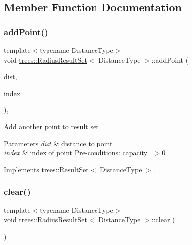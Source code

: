 \subsection{Member Function Documentation}
\mbox{\label{classtrees_1_1_radius_result_set_a65652623444c8beb35a1d27a86117b2a}} 
\subsubsection{\texorpdfstring{add\+Point()}{addPoint()}}
{\footnotesize\ttfamily template$<$typename Distance\+Type$>$ \\
void \hyperlink{classtrees_1_1_radius_result_set}{trees\+::\+Radius\+Result\+Set}$<$ Distance\+Type $>$\+::add\+Point (\begin{DoxyParamCaption}\item[{Distance\+Type}]{dist,  }\item[{size\+\_\+t}]{index }\end{DoxyParamCaption})\hspace{0.3cm}{\ttfamily [inline]}, {\ttfamily [virtual]}}

Add another point to result set 
\begin{DoxyParams}{Parameters}
{\em dist} & distance to point \\
\hline
{\em index} & index of point Pre-\/conditions\+: capacity\+\_\+$>$0 \\
\hline
\end{DoxyParams}


Implements \hyperlink{classtrees_1_1_result_set}{trees\+::\+Result\+Set$<$ Distance\+Type $>$}.

\mbox{\label{classtrees_1_1_radius_result_set_a4e41825c25577341937de798be4ab659}} 
\subsubsection{\texorpdfstring{clear()}{clear()}}
{\footnotesize\ttfamily template$<$typename Distance\+Type$>$ \\
void \hyperlink{classtrees_1_1_radius_result_set}{trees\+::\+Radius\+Result\+Set}$<$ Distance\+Type $>$\+::clear (\begin{DoxyParamCaption}{ }\end{DoxyParamCaption})\hspace{0.3cm}{\ttfamily [inline]}}

